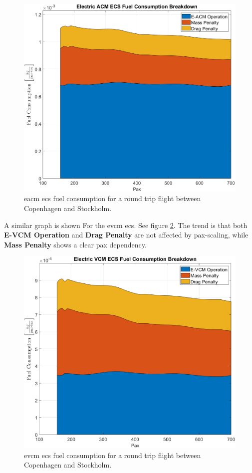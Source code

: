 \documentclass[english]{kththesis}
\begin{document}
\begin{figure}[!ht]
    \centering
    \includegraphics[width=1\textwidth]{Epictures/EACMECSfuelCon.png}
    \caption{\acrshort{eacm} \acrshort{ecs} fuel consumption for a round trip flight between Copenhagen and Stockholm.}
    \label{fig:EACMFuelCon}
\end{figure}

\clearpage

A similar graph is shown For the \acrshort{evcm} \acrshort{ecs}. See figure \ref{fig:EVCMFuelCon}. The trend is that both \textbf{E-VCM Operation} and \textbf{Drag Penalty} are not affected by pax-scaling, while \textbf{Mass Penalty} shows a clear pax dependency.

\begin{figure}[!ht]
    \centering
    \includegraphics[width=1\textwidth]{Epictures/EVCMECSfuelCon.png}
    \caption{\acrshort{evcm} \acrshort{ecs} fuel consumption for a round trip flight between Copenhagen and Stockholm.}
    \label{fig:EVCMFuelCon}
\end{figure}
\end{document}
